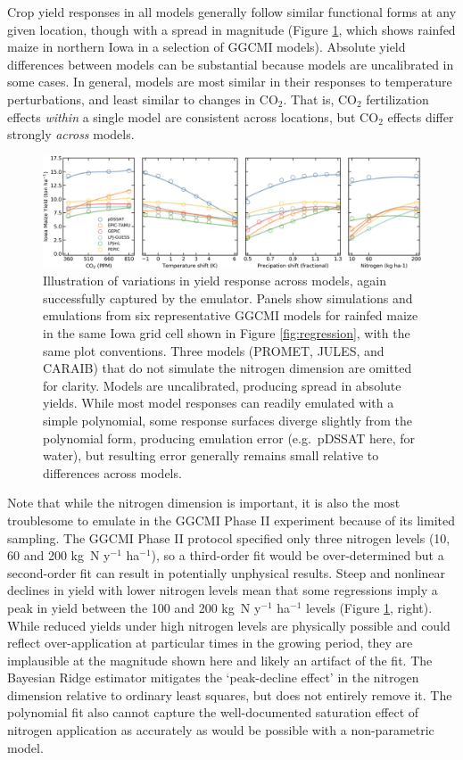 \documentclass[gmd, manuscript]{copernicus} %
\begin{document}
Crop yield responses in all models generally follow similar functional forms at any given location, though with a spread in magnitude (Figure \ref{fig:regression_2}, which shows rainfed maize in northern Iowa in a selection of GGCMI models). 
Absolute yield differences between models can be substantial because models are uncalibrated in some cases.
In general, models are most similar in their responses to temperature perturbations, and least similar to changes in CO$_2$. 
That is, CO$_2$ fertilization effects \textit{within} a single model are consistent across locations, but CO$_2$ effects differ strongly \textit{across} models. 

\begin{figure}[h!!]
\centering
    \includegraphics[width=16.3cm]{figures/regression_example_2.png}
    \caption{
    Illustration of variations in yield response across models, again successfully captured by the emulator. 
    Panels show simulations and emulations from six representative GGCMI models for rainfed maize in the same Iowa grid cell shown in Figure \ref{fig:regression}, with the same plot conventions. 
    Three models (PROMET, JULES, and CARAIB) that do not simulate the nitrogen dimension are omitted for clarity. 
    Models are uncalibrated, producing spread in absolute yields. 
    While most model responses can readily emulated with a simple polynomial, some response surfaces diverge slightly from the polynomial form, producing emulation error (e.g.\ pDSSAT here, for water), but 
    resulting error generally remains small relative to differences across models.
    }
   \label{fig:regression_2}
\end{figure}

Note that while the nitrogen dimension is important, it is also the most troublesome to emulate in the GGCMI Phase II experiment because of its limited sampling. 
The GGCMI Phase II protocol specified only three nitrogen levels (10, 60 and 200 kg~N y$^{-1}$ ha$^{-1}$), so a third-order fit would be over-determined but a second-order fit can result in potentially unphysical results. 
Steep and nonlinear declines in yield with lower nitrogen levels mean that some regressions imply a peak in yield between the 100 and 200 kg~N y$^{-1}$ ha$^{-1}$ levels (Figure \ref{fig:regression_2}, right). 
While reduced yields under high nitrogen levels are physically possible and could reflect over-application at particular times in the growing period, they are implausible at the magnitude shown here and likely an artifact of the fit. 
The Bayesian Ridge estimator mitigates the `peak-decline effect' in the nitrogen dimension relative to ordinary least squares, but does not entirely remove it. 
The polynomial fit also cannot capture the well-documented saturation effect of nitrogen application \citep[e.g.][]{Torsten77} as accurately as would be possible with a non-parametric model. 
\end{document}
